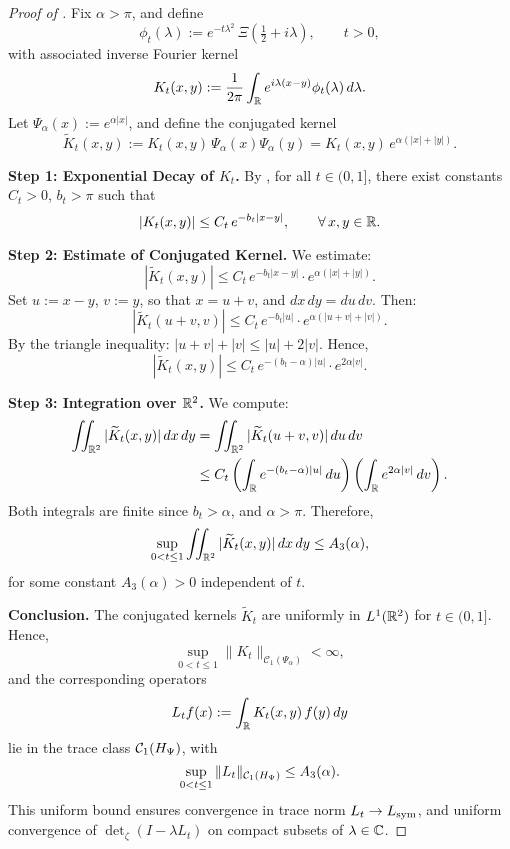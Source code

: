 \begin{proof}[Proof of ]
Fix \( \alpha > \pi \), and define
\[
\phi_t(\lambda) := e^{-t\lambda^2} \, \Xi\left( \tfrac{1}{2} + i\lambda \right), \qquad t > 0,
\]
with associated inverse Fourier kernel
\[
K_t(x,y) := \frac{1}{2\pi} \int_{\mathbb{R}} e^{i\lambda(x - y)} \phi_t(\lambda)\, d\lambda.
\]
Let \( \Psi_\alpha(x) := e^{\alpha |x|} \), and define the conjugated kernel
\[
\widetilde{K}_t(x,y) := K_t(x,y)\, \Psi_\alpha(x)\Psi_\alpha(y) = K_t(x,y)\, e^{\alpha(|x| + |y|)}.
\]

\medskip
\noindent\textbf{Step 1: Exponential Decay of \( K_t \).}
By , for all \( t \in (0,1] \), there exist constants \( C_t > 0 \), \( b_t > \pi \) such that
\[
|K_t(x,y)| \le C_t\, e^{-b_t |x - y|}, \qquad \forall\, x, y \in \mathbb{R}.
\]

\medskip
\noindent\textbf{Step 2: Estimate of Conjugated Kernel.}
We estimate:
\[
|\widetilde{K}_t(x,y)| \le C_t\, e^{-b_t |x - y|} \cdot e^{\alpha(|x| + |y|)}.
\]
Set \( u := x - y \), \( v := y \), so that \( x = u + v \), and \( dx\,dy = du\,dv \). Then:
\[
|\widetilde{K}_t(u + v, v)| \le C_t\, e^{-b_t |u|} \cdot e^{\alpha(|u + v| + |v|)}.
\]
By the triangle inequality: \( |u + v| + |v| \le |u| + 2|v| \). Hence,
\[
|\widetilde{K}_t(x,y)| \le C_t\, e^{-(b_t - \alpha)|u|} \cdot e^{2\alpha |v|}.
\]

\medskip
\noindent\textbf{Step 3: Integration over \( \mathbb{R}^2 \).}
We compute:
\[
\begin{aligned}
\iint_{\mathbb{R}^2} |\widetilde{K}_t(x,y)|\, dx\,dy
&= \iint_{\mathbb{R}^2} |\widetilde{K}_t(u + v, v)|\, du\,dv \\
&\le C_t \left( \int_{\mathbb{R}} e^{-(b_t - \alpha)|u|} \, du \right)
        \left( \int_{\mathbb{R}} e^{2\alpha |v|} \, dv \right).
\end{aligned}
\]
Both integrals are finite since \( b_t > \alpha \), and \( \alpha > \pi \). Therefore,
\[
\sup_{0 < t \le 1} \iint_{\mathbb{R}^2} |\widetilde{K}_t(x,y)|\, dx\,dy \le A_3(\alpha),
\]
for some constant \( A_3(\alpha) > 0 \) independent of \( t \).

\medskip
\noindent\textbf{Conclusion.}
The conjugated kernels \( \widetilde{K}_t \) are uniformly in \( L^1(\mathbb{R}^2) \) for \( t \in (0,1] \). Hence,
\[
\sup_{0 < t \le 1} \|K_t\|_{\mathcal{C}_1(\Psi_\alpha)} < \infty,
\]
and the corresponding operators
\[
L_t f(x) := \int_{\mathbb{R}} K_t(x,y)\, f(y)\, dy
\]
lie in the trace class \( \mathcal{C}_1(H_{\Psi}) \), with
\[
\sup_{0 < t \le 1} \|L_t\|_{\mathcal{C}_1(H_{\Psi})} \le A_3(\alpha).
\]
This uniform bound ensures convergence in trace norm \( L_t \to L_{\mathrm{sym}} \), and uniform convergence of \( \det_\zeta(I - \lambda L_t) \) on compact subsets of \( \lambda \in \mathbb{C} \).
\end{proof}
